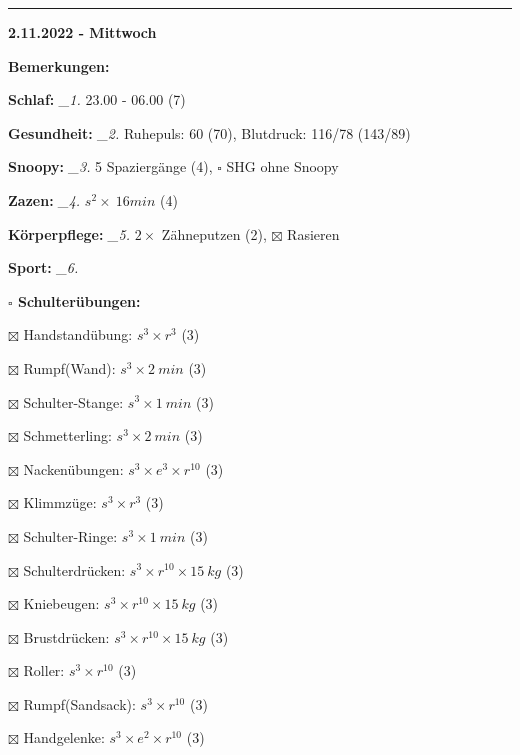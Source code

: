 \documentclass[10pt,a4paper]{article}
\newcommand\prop[1] {{\color {alizarin} {\bf #1}}}             %
\newcommand\rele[1] {{\color {english} \bf {#1}}}              %
\newcommand\mand[1] {{\color {burntorange} {\bf #1}}}          %
\newcommand\ddivide {\vskip -9pt \hrule \vskip 6pt}
\newcommand\topspace{\vskip -15pt \hskip 20pt}
\newcommand\n[1] { {\sl #1.} \hskip 5pt }
\begin{document}
\ddivide
{\rele {2.11.2022 - Mittwoch}}

\begin{mdframed}[style=daystyle]
  \begin{labeling}{{\mand {Bemerkungen:}}}
    \setlength\itemsep{-3pt}
  \item[{\mand {Schlaf:}}]        \n{\_1} 23.00 - 06.00 (7)
  \item[{\mand {Gesundheit:}}]    \n{\_2} Ruhepuls: 60 (70), Blutdruck: 116/78 (143/89)
  \item[{\mand {Snoopy:}}]        \n{\_3} 5 Spaziergänge (4), $\square$ SHG ohne Snoopy
  \item[{\mand {Zazen:}}]         \n{\_4} $s^2 \times\ 16 min$ (4)
  \item[{\mand {Körperpflege:}}]  \n{\_5} $2 \times$ Zähneputzen (2), $\boxtimes$  Rasieren
  \item[{\mand {Sport:}}]         \n{\_6}
    \topspace
    \begin{minipage}{0.75\textwidth}  
      \begin{labeling}{\prop {$\square$ {Schulterübungen:}}} 
        \setlength\itemsep{-3pt}
      \item[$\boxtimes$ Handstandübung:]  $s^3 \times r^{3}$ (3)
      \item[$\boxtimes$ Rumpf(Wand):]     $s^3 \times 2\ min$ (3)
      \item[$\boxtimes$ Schulter-Stange:] $s^3 \times 1\ min$ (3)
      \item[$\boxtimes$ Schmetterling:]   $s^3 \times 2\ min$ (3)
      \item[$\boxtimes$ Nackenübungen:]   $s^3 \times e^3 \times r^{10}$ (3)
      \item[$\boxtimes$ Klimmzüge:]       $s^3 \times r^3$ (3)
      \item[$\boxtimes$ Schulter-Ringe:]  $s^3 \times 1\ min$ (3)
      \item[$\boxtimes$ Schulterdrücken:] $s^3 \times r^{10} \times 15\ kg$ (3)
      \item[$\boxtimes$ Kniebeugen:]      $s^3 \times r^{10} \times 15\ kg$ (3)
      \item[$\boxtimes$ Brustdrücken:]    $s^3 \times r^{10} \times 15\ kg$ (3)
      \item[$\boxtimes$ Roller:]          $s^3 \times r^{10}$ (3)
      \item[$\boxtimes$ Rumpf(Sandsack):] $s^3 \times r^{10}$ (3)
      \item[$\boxtimes$ Handgelenke:]     $s^3 \times e^2 \times r^{10}$ (3)

\end{labeling}
\end{minipage}
\end{labeling}
\end{mdframed}
\end{document}
